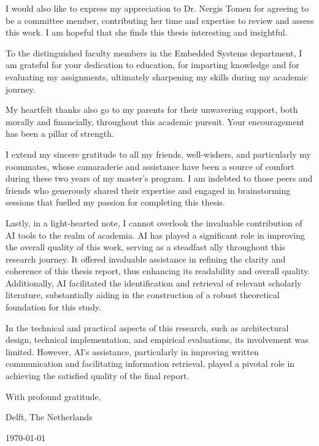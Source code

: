 \noindent I would also like to express my appreciation to Dr. Nergis Tomen for agreeing to be a committee member, contributing her time and expertise to review and assess this work. I am hopeful that she finds this thesis interesting and insightful.

\noindent To the distinguished faculty members in the Embedded Systems department, I am grateful for your dedication to education, for imparting knowledge and for evaluating my assignments, ultimately sharpening my skills during my academic journey.
\vspace{1\baselineskip}

\noindent My heartfelt thanks also go to my parents for their unwavering support, both morally and financially, throughout this academic pursuit. Your encouragement has been a pillar of strength.
\vspace{1\baselineskip}

\noindent I extend my sincere gratitude to all my friends, well-wishers, and particularly my roommates, whose camaraderie and assistance have been a source of comfort during these two years of my master's program. I am indebted to those peers and friends who generously shared their expertise and engaged in brainstorming sessions that fuelled my passion for completing this thesis.
\vspace{1\baselineskip}

\noindent Lastly, in a light-hearted note, I cannot overlook the invaluable contribution of AI tools to the realm of academia. AI has played a significant role in improving the overall quality of this work, serving as a steadfast ally throughout this research journey. It offered invaluable assistance in refining the clarity and coherence of this thesis report, thus enhancing its readability and overall quality. Additionally, AI facilitated the identification and retrieval of relevant scholarly literature, substantially aiding in the construction of a robust theoretical foundation for this study.
\vspace{1\baselineskip}

\noindent In the technical and practical aspects of this research, such as architectural design, technical implementation, and empirical evaluations, its involvement was limited. However, AI's assistance, particularly in improving written communication and facilitating information retrieval, played a pivotal role in achieving the satisfied quality of the final report.
\vspace{1\baselineskip}

\noindent With profound gratitude,

\noindent\reportAuthor

\vspace{1\baselineskip}

\noindent
Delft, The Netherlands

\noindent
\today